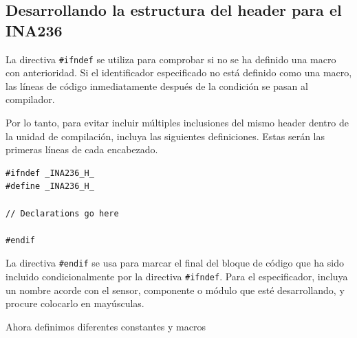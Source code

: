 \documentclass[
10pt, %
a4paper, %
oneside, %
headinclude,footinclude, %
BCOR5mm, %
]{scrartcl}
\begin{document}
\subsection{Desarrollando la estructura del header para el INA236}

La directiva \texttt{\#ifndef} se utiliza para comprobar si no se ha definido una macro con anterioridad. Si el identificador especificado no está definido como una macro, las líneas de código inmediatamente después de la condición se pasan al compilador.

Por lo tanto, para evitar incluir múltiples inclusiones del mismo header dentro de la unidad de compilación, incluya las siguientes definiciones. Estas serán las primeras líneas de cada encabezado.


\begin{lstlisting}[firstnumber=1,style=CStyle]
#ifndef _INA236_H_
#define _INA236_H_

// Declarations go here

#endif
\end{lstlisting}

La directiva \texttt{\#endif} se usa para marcar el final del bloque de código que ha sido incluido condicionalmente por la directiva \texttt{\#ifndef}.
Para el especificador, incluya un nombre acorde con el sensor, componente o módulo que esté desarrollando, y procure colocarlo en mayúsculas.

Ahora definimos diferentes constantes y macros  
\end{document}
